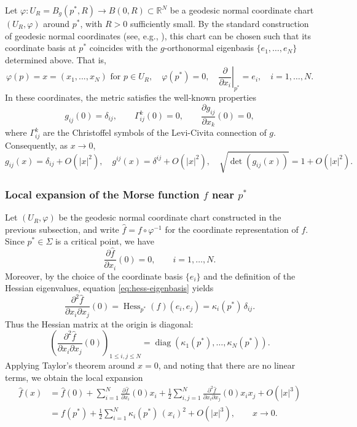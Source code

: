 \documentclass[12pt,reqno]{amsart}
\numberwithin{equation}{section}
\begin{document}
Let \(\varphi: U_R = B_g(p^*,R) \to B(0,R) \subset \mathbb R^N\) be a geodesic normal coordinate chart $(U_R,\varphi)$ around \(p^*\), with \(R>0\) sufficiently small. By the standard construction of geodesic normal coordinates (see, e.g., \cite{RGA}), this chart can be chosen such that its coordinate basis at \(p^*\) coincides with the \(g\)-orthonormal eigenbasis \(\{e_1,\ldots,e_N\}\) determined above. That is, 
\[
\varphi(p)=x=(x_1,...,x_N) \text{ for } p\in U_R, \quad \varphi(p^*)=0,  \quad 
\left.\frac{\partial}{\partial x_i}\right|_{p^*} = e_i, \quad i=1,\ldots,N.
\]
In these coordinates, the metric satisfies the well-known properties
\[
g_{ij}(0)=\delta_{ij}, \qquad
\Gamma_{ij}^k(0)=0, \qquad
\frac{\partial g_{ij}}{\partial x_k}(0)=0,
\]
where \(\Gamma_{ij}^k\) are the Christoffel symbols of the Levi-Civita connection of \(g\). Consequently, as \(x\to0\),
\begin{equation}\label{tay}
g_{ij}(x)
=
\delta_{ij}+O(|x|^2),
\quad
g^{ij}(x)
=
\delta^{ij}+O(|x|^2),
\quad
\sqrt{\det(g_{ij}(x))}
=
1+O(|x|^2).
\end{equation}



\subsubsection{Local expansion of the Morse function $f$ near $p^*$}

Let $(U_R,\varphi)$ be the geodesic normal coordinate chart constructed in the previous subsection, and write $\hat f = f \circ \varphi^{-1}$ for the coordinate representation of $f$. Since $p^*\in\Sigma$ is a critical point, we have
\[
\frac{\partial \hat f}{\partial x_i}(0)=0,\qquad i=1,\ldots,N.
\]
Moreover, by the choice of the coordinate basis $\{e_i\}$ and the definition of the Hessian eigenvalues, equation \eqref{eq:hess-eigenbasis} yields
\[
\frac{\partial^2 \hat f}{\partial x_i \partial x_j}(0)
=
\operatorname{Hess}_{p^*}(f)(e_i,e_j)
=
\kappa_i(p^*)\,\delta_{ij}.
\]
Thus the Hessian matrix at the origin is diagonal:
\[
\left(
\frac{\partial^2 \hat f}{\partial x_i \partial x_j}(0)
\right)_{1\le i,j\le N}
=
\operatorname{diag}(\kappa_1(p^*),\ldots,\kappa_N(p^*)).
\]
Applying Taylor's theorem around $x=0$, and noting that there are no linear terms, we obtain the local expansion
\begin{align}
\hat f(x)
&=
\hat f(0)
+
\sum_{i=1}^N
\frac{\partial \hat f}{\partial x_i}(0)x_i
+
\frac12
\sum_{i,j=1}^N
\frac{\partial^2 \hat f}{\partial x_i \partial x_j}(0)x_i x_j
+
O(|x|^3)
\nonumber\\
&=
f(p^*)
+
\frac12\sum_{i=1}^N \kappa_i(p^*)\,(x_i)^2
+
O(|x|^3),
\qquad x\to0.
\label{localexpansionf}
\end{align}
\end{document}
